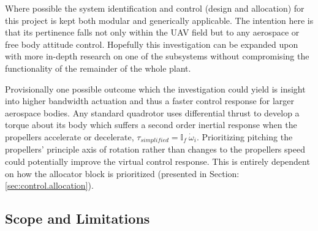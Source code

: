 \par
Where possible the system identification and control (design and allocation) for this project is kept both modular and generically applicable. The intention here is that its pertinence falls not only within the UAV field but to any aerospace or free body attitude control. Hopefully this investigation can be expanded upon with more in-depth research on one of the subsystems without compromising the functionality of the remainder of the whole plant.
\par
Provisionally one possible outcome which the investigation could yield is insight into higher bandwidth actuation and thus a faster control response for larger aerospace bodies. Any standard quadrotor uses differential thrust to develop a torque about its body which suffers a second order inertial response when the propellers accelerate or decelerate, $\tau_{simplified}=\mathbb{I}_f~\dot{\omega}_{i}$. Prioritizing pitching the propellers' principle axis of rotation rather than changes to the propellers speed could potentially improve the virtual control response. This is entirely dependent on how the allocator block is prioritized (presented in Section:\ref{sec:control.allocation}).
\subsection{Scope and Limitations}
\label{subsec:intro.foreword.scopeandlim}
